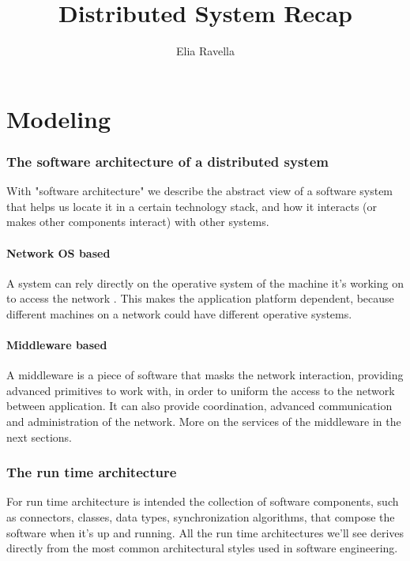 \documentclass[10pt,a4paper]{article}
\author{Elia Ravella}
\title{Distributed System Recap}
\begin{document}
	\begin{titlepage}
		\maketitle
	\end{titlepage}
	
	\tableofcontents
	\clearpage
	
	\part{Modeling}
		\section{The software architecture of a distributed system}
			With "software architecture" we describe the abstract view of a software system that helps us locate it in a certain technology stack, and how it interacts (or makes other components interact) with other systems.
			
			\subsection{Network OS based}
				A system can rely directly on the operative system of the machine it's working on to access the network	. This makes the application platform dependent, because different machines on a network could have different operative systems.
				
			\subsection{Middleware based}
				A middleware is a piece of software that masks the network interaction, providing advanced primitives to work with, in order to uniform the access to the network between application. It can also provide coordination, advanced communication and administration of the network. More on the services of the middleware in the next sections.
		
		\section{The run time architecture}
			For run time architecture is intended the collection of software components, such as connectors, classes, data types, synchronization algorithms, that compose the software when it's up and running. All the run time architectures we'll see derives directly from the most common architectural styles used in software engineering.
			
\end{document}
